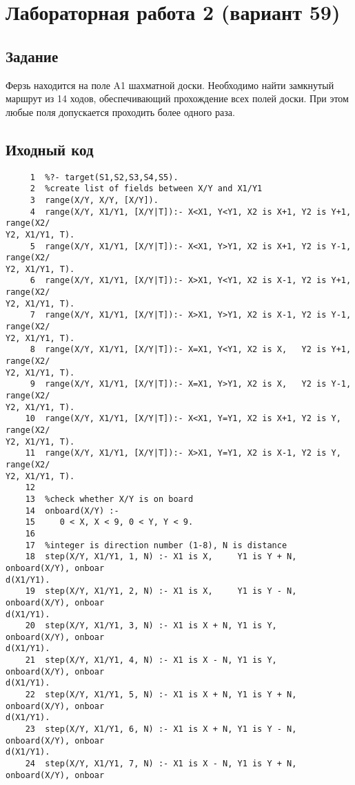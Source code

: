 \section{Лабораторная работа 2 (вариант 59)}
\subsection{Задание}


Ферзь находится на поле A1 шахматной доски. Необходимо найти замкнутый маршрут из 14 ходов, обеспечивающий прохождение всех полей доски. При этом любые поля допускается проходить более одного раза.

\subsection{Иходный код}
\begin{verbatim}
     1  %?- target(S1,S2,S3,S4,S5).
     2  %create list of fields between X/Y and X1/Y1
     3  range(X/Y, X/Y, [X/Y]).
     4  range(X/Y, X1/Y1, [X/Y|T]):- X<X1, Y<Y1, X2 is X+1, Y2 is Y+1, range(X2/
Y2, X1/Y1, T).
     5  range(X/Y, X1/Y1, [X/Y|T]):- X<X1, Y>Y1, X2 is X+1, Y2 is Y-1, range(X2/
Y2, X1/Y1, T).
     6  range(X/Y, X1/Y1, [X/Y|T]):- X>X1, Y<Y1, X2 is X-1, Y2 is Y+1, range(X2/
Y2, X1/Y1, T).
     7  range(X/Y, X1/Y1, [X/Y|T]):- X>X1, Y>Y1, X2 is X-1, Y2 is Y-1, range(X2/
Y2, X1/Y1, T).
     8  range(X/Y, X1/Y1, [X/Y|T]):- X=X1, Y<Y1, X2 is X,   Y2 is Y+1, range(X2/
Y2, X1/Y1, T).
     9  range(X/Y, X1/Y1, [X/Y|T]):- X=X1, Y>Y1, X2 is X,   Y2 is Y-1, range(X2/
Y2, X1/Y1, T).
    10  range(X/Y, X1/Y1, [X/Y|T]):- X<X1, Y=Y1, X2 is X+1, Y2 is Y,   range(X2/
Y2, X1/Y1, T).
    11  range(X/Y, X1/Y1, [X/Y|T]):- X>X1, Y=Y1, X2 is X-1, Y2 is Y,   range(X2/
Y2, X1/Y1, T).
    12   
    13  %check whether X/Y is on board
    14  onboard(X/Y) :-
    15     0 < X, X < 9, 0 < Y, Y < 9.
    16   
    17  %integer is direction number (1-8), N is distance
    18  step(X/Y, X1/Y1, 1, N) :- X1 is X,     Y1 is Y + N, onboard(X/Y), onboar
d(X1/Y1).
    19  step(X/Y, X1/Y1, 2, N) :- X1 is X,     Y1 is Y - N, onboard(X/Y), onboar
d(X1/Y1).
    20  step(X/Y, X1/Y1, 3, N) :- X1 is X + N, Y1 is Y,     onboard(X/Y), onboar
d(X1/Y1).
    21  step(X/Y, X1/Y1, 4, N) :- X1 is X - N, Y1 is Y,     onboard(X/Y), onboar
d(X1/Y1).
    22  step(X/Y, X1/Y1, 5, N) :- X1 is X + N, Y1 is Y + N, onboard(X/Y), onboar
d(X1/Y1).
    23  step(X/Y, X1/Y1, 6, N) :- X1 is X + N, Y1 is Y - N, onboard(X/Y), onboar
d(X1/Y1).
    24  step(X/Y, X1/Y1, 7, N) :- X1 is X - N, Y1 is Y + N, onboard(X/Y), onboar

\end{verbatim}
